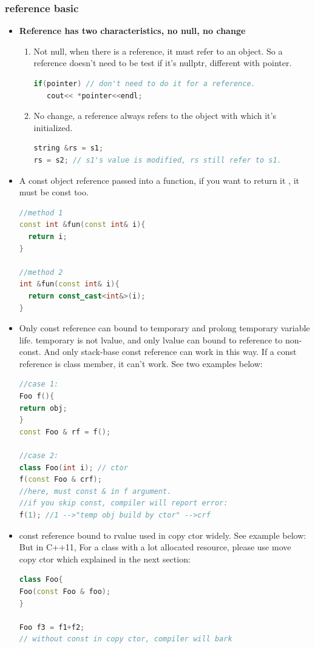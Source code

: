 \documentclass[a4paper,12pt,twoside]{book}
\begin{document}
\subsubsection{reference basic}
\begin{itemize}
\item \textbf{Reference has two characteristics, no null, no change}
\begin{enumerate}
\item Not null, when there is a reference, it must refer to an object. So a reference doesn't need to be test if it's nullptr, different with pointer.
\begin{lstlisting}[frame=single, language=c++]
if(pointer) // don't need to do it for a reference.
   cout<< *pointer<<endl;
\end{lstlisting}

\item No change, a reference always refers to the object with which it's initialized.
\begin{lstlisting}[frame=single, language=c++]
string &rs = s1;
rs = s2; // s1's value is modified, rs still refer to s1.
\end{lstlisting}
\end{enumerate}


\item A const object reference passed into a function, if you want to return it , it must be const too.
\begin{lstlisting}[frame=single, language=c++]
//method 1
const int &fun(const int& i){
  return i;
}

//method 2
int &fun(const int& i){
  return const_cast<int&>(i);
}
\end{lstlisting}

\item Only const reference can bound to temporary and prolong temporary variable life. temporary is not lvalue, and only lvalue can bound to reference to non-const. And only stack-base const reference can work in this way. If a const reference is class member, it can't work.  See two examples below:
\begin{lstlisting}[frame=single, language=c++]
//case 1:
Foo f(){
return obj;
}
const Foo & rf = f();

//case 2:
class Foo(int i); // ctor
f(const Foo & crf);
//here, must const & in f argument.
//if you skip const, compiler will report error:
f(1); //1 -->"temp obj build by ctor" -->crf
\end{lstlisting}

\item const reference bound to rvalue used in copy ctor widely. See example below: But in C++11, For a class with a lot allocated resource, please use move copy ctor which explained in the next section:
\begin{lstlisting}[frame=single, language=c++]
class Foo{
Foo(const Foo & foo);
}

Foo f3 = f1+f2;
// without const in copy ctor, compiler will bark
\end{lstlisting}
\end{itemize}
\end{document}

